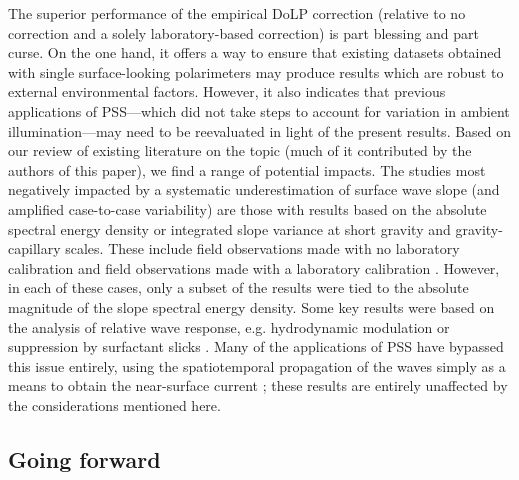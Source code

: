 \documentclass[letterpaper,journal]{IEEEtran}
\begin{document}
	The superior performance of the empirical DoLP correction (relative to no correction and a solely laboratory-based correction) is part blessing and part curse. On the one hand, it offers a way to ensure that existing datasets obtained with single surface-looking polarimeters may produce results which are robust to external environmental factors. However, it also indicates that previous applications of PSS---which did not take steps to account for variation in ambient illumination---may need to be reevaluated in light of the present results. Based on our review of existing literature on the topic (much of it contributed by the authors of this paper), we find a range of potential impacts. The studies most negatively impacted by a systematic underestimation of surface wave slope (and amplified case-to-case variability) are those with results based on the absolute spectral energy density or integrated slope variance at short gravity and gravity-capillary scales. These include field observations made with no laboratory calibration \cite{Laxague2015} and field observations made with a laboratory calibration \cite{Zappa2012,Laxague2018b}. However, in each of these cases, only a subset of the results were tied to the absolute magnitude of the slope spectral energy density. Some key results were based on the analysis of relative wave response, e.g. hydrodynamic modulation \cite{Laxague2017a} or suppression by surfactant slicks \cite{laxague_suppression_2024}. Many of the applications of PSS have bypassed this issue entirely, using the spatiotemporal propagation of the waves simply as a means to obtain the near-surface current \cite{laxague2017b,Laxague2018a,Laxague2020a,Laxague2020b}; these results are entirely unaffected by the considerations mentioned here.
	
	\subsection{Going forward}
	\label{sec:forward}
	
\end{document}

